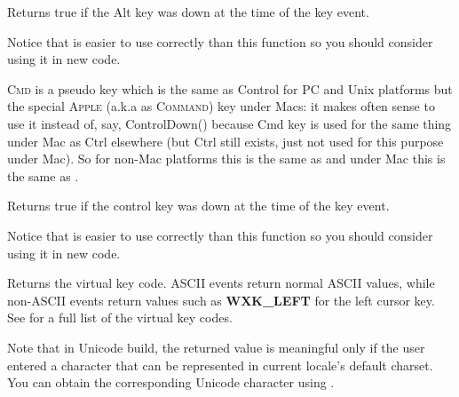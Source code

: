 \label{wxkeyeventaltdown}


Returns true if the Alt key was down at the time of the key event.

Notice that  is easier to use
correctly than this function so you should consider using it in new code.


\label{wxkeyeventcmddown}


\textsc{Cmd} is a pseudo key which is the same as Control for PC and Unix
platforms but the special \textsc{Apple} (a.k.a as \textsc{Command}) key under
Macs: it makes often sense to use it instead of, say, ControlDown() because Cmd
key is used for the same thing under Mac as Ctrl elsewhere (but Ctrl still
exists, just not used for this purpose under Mac). So for non-Mac platforms
this is the same as  and under
Mac this is the same as .


\label{wxkeyeventcontroldown}


Returns true if the control key was down at the time of the key event.

Notice that  is easier to use
correctly than this function so you should consider using it in new code.


\label{wxkeyeventgetkeycode}


Returns the virtual key code. ASCII events return normal ASCII values,
while non-ASCII events return values such as {\bf WXK\_LEFT} for the
left cursor key. See  for a full list of
the virtual key codes.

Note that in Unicode build, the returned value is meaningful only if the
user entered a character that can be represented in current locale's default
charset. You can obtain the corresponding Unicode character using
.


\label{wxkeyeventgetmodifiers}


